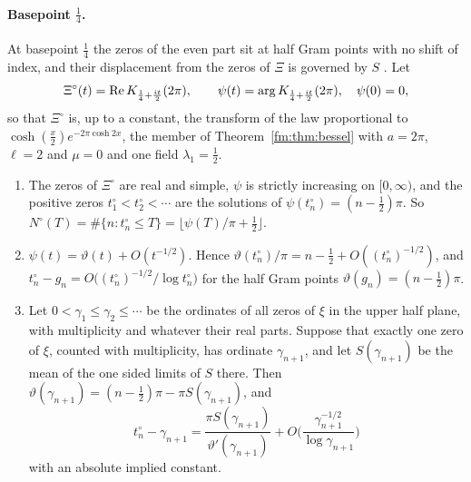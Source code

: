 \paragraph{Basepoint $\frac14$.} At basepoint $\frac14$ the zeros of the even part sit at half Gram points with no shift of index, and their displacement from the zeros of $\Xi$ is governed by $S$ \cite{P26gumbelop}. Let
\[
\Xi^\circ(t)=\operatorname{Re} K_{\frac14+\frac{it}2}(2\pi),\qquad\psi(t)=\arg K_{\frac14+\frac{it}2}(2\pi),\quad\psi(0)=0,
\]
so that $\Xi^\circ$ is, up to a constant, the transform of the law proportional to $\cosh(\frac x2)e^{-2\pi\cosh2x}$, the member of Theorem~\ref{fm:thm:bessel} with $a=2\pi$, $\ell=2$ and $\mu=0$ and one field $\lambda_1=\frac12$.

\begin{proposition}\label{pol:prop:skeleton}
\begin{enumerate}
\item[(i)] The zeros of $\Xi^\circ$ are real and simple, $\psi$ is strictly increasing on $[0,\infty)$, and the positive zeros $t^\circ_1<t^\circ_2<\cdots$ are the solutions of $\psi(t^\circ_n)=(n-\frac12)\pi$. So $N^\circ(T)=\#\{n:t^\circ_n\le T\}=\lfloor\psi(T)/\pi+\frac12\rfloor$.
\item[(ii)] $\psi(t)=\vartheta(t)+O(t^{-1/2})$. Hence $\vartheta(t^\circ_n)/\pi=n-\frac12+O((t^\circ_n)^{-1/2})$, and $t^\circ_n-g_n=O\big((t^\circ_n)^{-1/2}/\log t^\circ_n\big)$ for the half Gram points $\vartheta(g_n)=(n-\frac12)\pi$.
\item[(iii)] Let $0<\gamma_1\le\gamma_2\le\cdots$ be the ordinates of all zeros of $\xi$ in the upper half plane, with multiplicity and whatever their real parts. Suppose that exactly one zero of $\xi$, counted with multiplicity, has ordinate $\gamma_{n+1}$, and let $S(\gamma_{n+1})$ be the mean of the one sided limits of $S$ there. Then $\vartheta(\gamma_{n+1})=(n-\frac12)\pi-\pi S(\gamma_{n+1})$, and
\[
t^\circ_n-\gamma_{n+1}=\frac{\pi S(\gamma_{n+1})}{\vartheta'(\gamma_{n+1})}+O\Big(\frac{\gamma_{n+1}^{-1/2}}{\log\gamma_{n+1}}\Big)
\]
with an absolute implied constant.
\end{enumerate}
\end{proposition}

